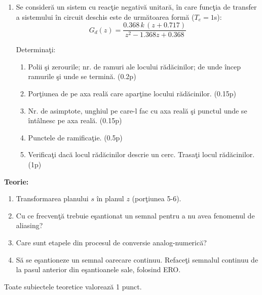 \documentclass[11pt,a4paper]{article}
\begin{document}
\begin{enumerate}[leftmargin=1.4em]
\begin{enumerate}[label=\alph*)]
\item S\u{a} se determine func\c{t}ia de transfer discret\u{a} a sistemului \^{i}n circuit \^{i}nchis. (1p)
\item Folosind ecua\c{t}ia cu diferen\c{t}e, s\u{a} se determine func\c{t}ia de transfer discret\u{a} a sistemului \^{i}n circuit deschis. (1p)
\item S\u{a} se determine pentru ce tip de intrare sistemul prezint\u{a} eroare sta\c{t}ionar\u{a} finit\u{a}. (0.5p)
\item S\u{a} se determine r\u{a}spunsul sistemului la m\u{a}rimea de intrare treapt\u{a} unitar\u{a} \c{s}i s\u{a} se reprezinte grafic. (1p)
\item S\u{a} se traseze caracteristicile de frecven\c{t}\u{a} amplitudine-pulsa\c{t}ie \c{s}i faz\u{a}-pulsa\c{t}ie. (1.5p)
\item S\u{a} se determine modelul cu variabile de stare pentru sistemul discret \^{i}n circuit \^{i}nchis. (1p)
\end{enumerate}
\emph{*pt punctele c,d,e,f se vor folosi rezultatele de la punctul a.}

\item Se consider\u{a} un sistem cu reac\c{t}ie negativ\u{a} unitar\u{a}, \^{i}n care func\c{t}ia de transfer a sistemului \^{i}n circuit deschis este de urm\u{a}toarea form\u{a} ($T_e=1$s):
$$G_d(z)=\frac{0.368\,k\,(z+0.717)}{z^2-1.368z+0.368}$$

Determina\c{t}i:
\begin{enumerate}[label=\alph*)]
\item Polii \c{s}i zerourile; nr. de ramuri ale locului r\u{a}d\u{a}cinilor; de unde \^{i}ncep ramurile \c{s}i unde se termin\u{a}. (0.2p)
\item Por\c{t}iunea de pe axa real\u{a} care apar\c{t}ine locului r\u{a}d\u{a}cinilor. (0.15p)
\item Nr. de asimptote, unghiul pe care-l fac cu axa real\u{a} \c{s}i punctul unde se \^{i}nt\^{a}lnesc pe axa real\u{a}. (0.15p)
\item Punctele de ramifica\c{t}ie. (0.5p)
\item Verifica\c{t}i dac\u{a} locul r\u{a}d\u{a}cinilor descrie un cerc. Trasa\c{t}i locul r\u{a}d\u{a}cinilor. (1p)
\end{enumerate}

\end{enumerate}

\textbf{Teorie:}
\begin{enumerate}[leftmargin=1.4em]
\item Transformarea planului $s$ \^{i}n planul $z$ (por\c{t}iunea 5-6).
\item Cu ce frecven\c{t}\u{a} trebuie e\c{s}antionat un semnal pentru a nu avea fenomenul de aliasing?
\item Care sunt etapele din procesul de conversie analog-numeric\u{a}?
\item S\u{a} se e\c{s}antioneze un semnal oarecare continuu. Reface\c{t}i semnalul continuu de la pasul anterior din e\c{s}antioanele sale, folosind ERO.
\end{enumerate}

\vspace{0.2cm}
\small Toate subiectele teoretice valoreaz\u{a} 1 punct.
\end{document}
